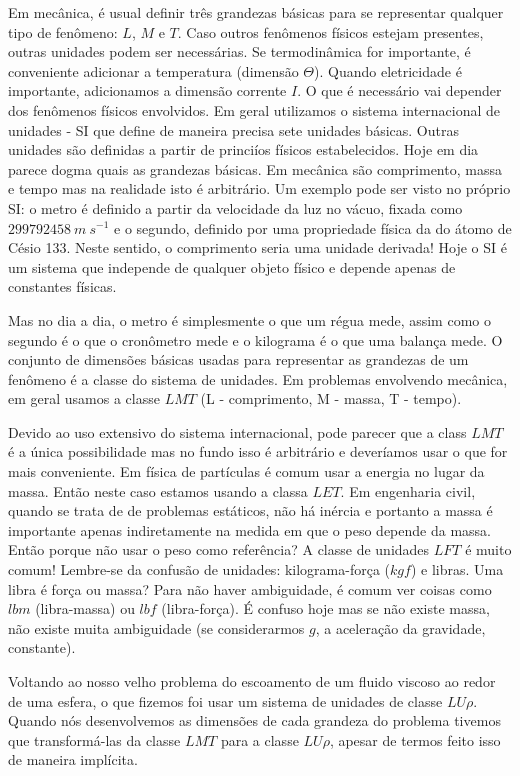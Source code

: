 Em mecânica, é usual definir três grandezas básicas para se representar qualquer tipo de fenômeno: $L$, $M$ e $T$. Caso outros fenômenos físicos estejam presentes, outras unidades podem ser necessárias. Se termodinâmica for importante, é conveniente adicionar a temperatura (dimensão $\Theta$). Quando eletricidade é importante, adicionamos a dimensão corrente $I$. O que é necessário vai depender dos fenômenos físicos envolvidos. Em geral utilizamos o sistema internacional de unidades \cite{BIPM19}  - SI que define de maneira precisa sete unidades básicas. Outras unidades são definidas a partir de princiíos físicos estabelecidos. Hoje em dia parece dogma quais as grandezas básicas. Em mecânica são comprimento, massa e tempo mas na realidade isto é arbitrário. Um exemplo pode ser visto no próprio SI: o metro é definido a partir da velocidade da luz no vácuo, fixada como $299 792 458 \: m\:s^{-1}$ e o segundo, definido por uma propriedade física da do átomo de Césio 133. Neste sentido, o comprimento seria uma unidade derivada! Hoje o SI é um sistema que independe de qualquer objeto físico e depende apenas de constantes físicas.

Mas no dia a dia, o metro é simplesmente o que um régua mede, assim como o segundo é o que o cronômetro mede e o kilograma é o que uma balança mede. O conjunto de dimensões básicas usadas para representar as grandezas de um fenômeno é a classe do sistema de unidades. Em problemas envolvendo mecânica, em geral usamos a classe $LMT$ (L - comprimento, M - massa, T - tempo).

Devido ao uso extensivo do sistema internacional, pode parecer que a class $LMT$ é a única possibilidade mas no fundo isso é arbitrário e deveríamos usar o que for mais conveniente. Em física de partículas é comum usar a energia no lugar da massa. Então neste caso estamos usando a classa $LET$. Em engenharia civil, quando se trata de de problemas estáticos, não há inércia e portanto a massa é importante apenas indiretamente na medida em que o peso depende da massa. Então porque não usar o peso como referência? A classe de unidades $LFT$ é muito comum! Lembre-se da confusão de unidades: kilograma-força ($kgf$) e libras. Uma libra é força ou massa? Para não haver ambiguidade, é comum ver coisas como $lbm$ (libra-massa) ou $lbf$ (libra-força). É confuso hoje mas se não existe massa, não existe muita ambiguidade (se considerarmos $g$, a aceleração da gravidade, constante).

Voltando ao nosso velho problema do escoamento de um fluido viscoso ao redor de uma esfera, o que fizemos foi usar um sistema de unidades de classe $LU\rho$. Quando nós desenvolvemos as dimensões de cada grandeza do problema tivemos que transformá-las da classe $LMT$ para a classe $LU\rho$, apesar de termos feito isso de maneira implícita.

